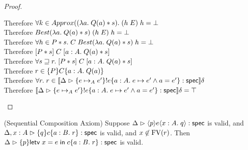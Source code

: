 \begin{proof}
\begin{tabbedproof}
    \oooooo Therefore $\forall k \in Approx((\semfun{a}{Q(a)*s}).\; (h\;E)\;h = \bot$ \\
    \oooooo Therefore $Best(\semfun{a}{Q(a)*s})\;(h\;E)\;h = \bot$ \\
    \ooooo Therefore $\forall h \in P*s.\; C\;Best(\semfun{a}{Q(a)*s})\;h = \bot$ \\
    \ooooo Therefore $\basicspec{P*s}{C}{a:A}{Q(a)*s}$ \\
    \oooo Therefore $\forall s \sqsupseteq r.\; \basicspec{P*s}{C}{a:A}{Q(a)*s}$ \\
    \oooo Therefore $r \in \spec{P}{C}{a:A}{Q(a)}$ \\
    \ooo Therefore $\forall r.\; r \in \interp{\judgeS{\spec{e \pointsto_A e'}{!e}{a:A}{e \pointsto e' \land a = e'}}}\delta$ \\
    \ooo Therefore $\interp{\judgeS{\spec{e \pointsto_A e'}{!e}{a:A}{e \pointsto e' \land a = e'}}}\delta = \top$ \\
  \end{tabbedproof}
\end{proof}

\begin{lemma}{(Sequential Composition Axiom)}
Suppose $\judgeS{\mspec{p}{e}{x:A}{q}}$ is valid, and $\judgeS[\Delta,x:A]{\spec{q}{c}{a:B}{r}}$ is valid, and $x \not\in \FV{r}$. Then $\judgeS{\spec{p}{\letv{x}{e}{c}}{a:B}{r}}$ is valid. 
\end{lemma}

